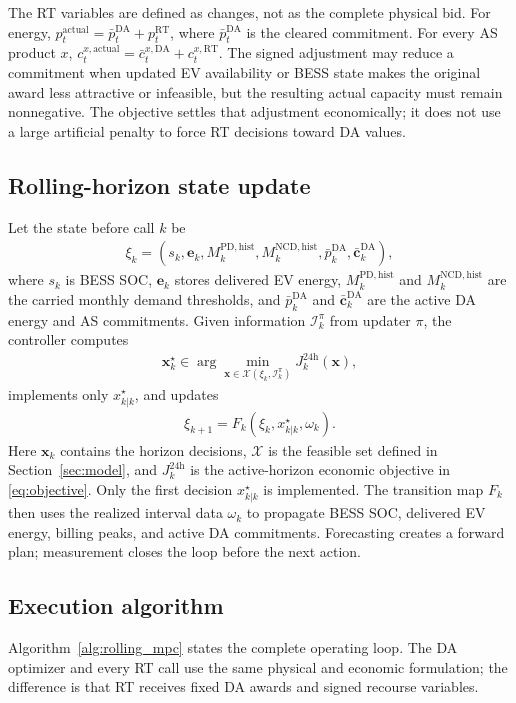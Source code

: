\documentclass[final,5p,times]{elsarticle}
\newcommand{\DA}{\mathrm{DA}}
\newcommand{\RT}{\mathrm{RT}}
\newcommand{\PD}{\mathrm{PD}}
\newcommand{\NCD}{\mathrm{NCD}}
\newcommand{\actual}{\mathrm{actual}}
\newcommand{\hist}{\mathrm{hist}}
\begin{document}
The RT variables are defined as changes, not as the complete physical bid. For energy, $p_t^{\actual}=\bar p_t^{\DA}+p_t^{\RT}$, where $\bar p_t^{\DA}$ is the cleared commitment. For every AS product $x$, $c_t^{x,\actual}=\bar c_t^{x,\DA}+c_t^{x,\RT}$. The signed adjustment may reduce a commitment when updated EV availability or BESS state makes the original award less attractive or infeasible, but the resulting actual capacity must remain nonnegative. The objective settles that adjustment economically; it does not use a large artificial penalty to force RT decisions toward DA values.

\subsection{Rolling-horizon state update}
Let the state before call $k$ be
\begin{align}
\xi_k=\left(s_k,\boldsymbol e_k,M_k^{\PD,\hist},M_k^{\NCD,\hist},
\bar p_k^{\DA},\bar{\boldsymbol c}_k^{\DA}\right),
\label{eq:state_vector_main}
\end{align}
where $s_k$ is BESS SOC, $\boldsymbol e_k$ stores delivered EV energy,
$M_k^{\PD,\hist}$ and $M_k^{\NCD,\hist}$ are the carried monthly demand
thresholds, and $\bar p_k^{\DA}$ and $\bar{\boldsymbol c}_k^{\DA}$ are the
active DA energy and AS commitments. Given information $\mathcal I_k^\pi$
from updater $\pi$, the controller computes
\begin{align}
\boldsymbol x_k^\star\in\arg\min_{\boldsymbol x\in\mathcal X(\xi_k,\mathcal I_k^\pi)}
J_k^{24\mathrm h}(\boldsymbol x),
\label{eq:mpc_problem_main}
\end{align}
implements only $x_{k|k}^\star$, and updates
\begin{align}
\xi_{k+1}=F_k(\xi_k,x_{k|k}^\star,\omega_k).
\label{eq:mpc_update_main}
\end{align}
Here $\boldsymbol x_k$ contains the horizon decisions, $\mathcal X$ is the
feasible set defined in Section~\ref{sec:model}, and $J_k^{24\mathrm h}$ is the
active-horizon economic objective in \eqref{eq:objective}. Only the first
decision $x_{k|k}^\star$ is implemented. The transition map $F_k$ then uses
the realized interval data $\omega_k$ to propagate BESS SOC, delivered EV
energy, billing peaks, and active DA commitments. Forecasting creates a forward
plan; measurement closes the loop before the next action.

\subsection{Execution algorithm}
Algorithm~\ref{alg:rolling_mpc} states the complete operating loop. The DA
optimizer and every RT call use the same physical and economic formulation;
the difference is that RT receives fixed DA awards and signed recourse
variables.
\end{document}
